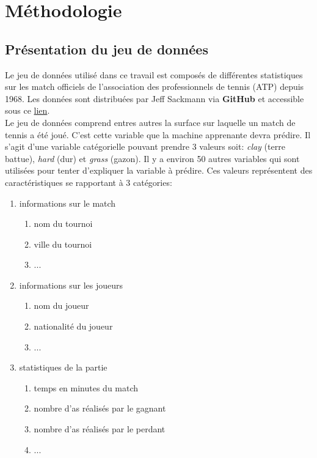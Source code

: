 \section{Méthodologie}

\subsection{Présentation du jeu de données}

Le jeu de données utilisé dans ce travail est composés de différentes statistiques sur les match officiels de l'association des professionnels de tennis (ATP) depuis 1968. Les données sont distribuées par Jeff Sackmann via \textbf{GitHub} et accessible sous ce \href{https://github.com/JeffSackmann/tennis_atp}{lien}.\\

Le jeu de données comprend entres autres la surface sur laquelle un match de tennis a été joué. C'est cette variable que la machine apprenante devra prédire. Il s'agit d'une variable catégorielle pouvant prendre 3 valeurs soit: \textit{clay} (terre battue), \textit{hard} (dur) et \textit{grass} (gazon). Il y a environ 50 autres variables qui sont utilisées pour tenter d'expliquer la variable à prédire. Ces valeurs représentent des caractéristiques se rapportant à 3 catégories:

\begin{enumerate}
  \item informations sur le match
    \begin{enumerate}
      \item nom du tournoi
      \item ville du tournoi
      \item ...
    \end{enumerate}
  \item informations sur les joueurs
    \begin{enumerate}
      \item nom du joueur
      \item nationalité du joueur
      \item ...
    \end{enumerate}
  \item statistiques de la partie
    \begin{enumerate}
      \item temps en minutes du match
      \item nombre d'as réalisés par le gagnant
      \item nombre d'as réalisés par le perdant
      \item ...
    \end{enumerate}
\end{enumerate}


